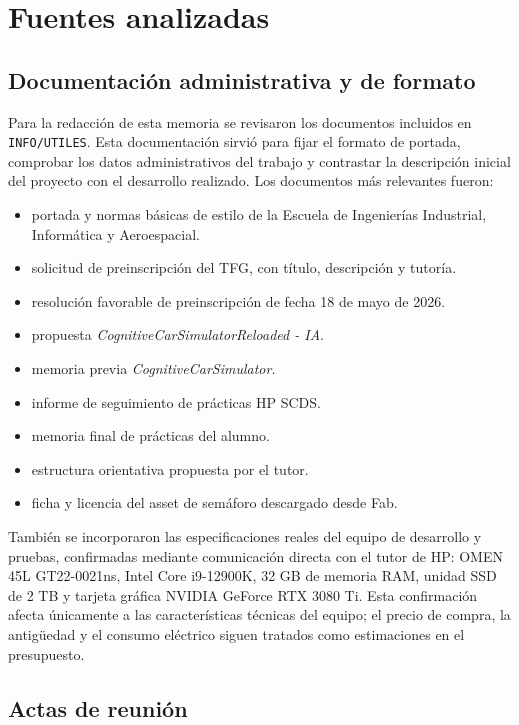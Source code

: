 \chapter{Fuentes analizadas}

\section{Documentación administrativa y de formato}

Para la redacción de esta memoria se revisaron los documentos incluidos en \texttt{INFO/UTILES}. Esta documentación sirvió para fijar el formato de portada, comprobar los datos administrativos del trabajo y contrastar la descripción inicial del proyecto con el desarrollo realizado. Los documentos más relevantes fueron:

\begin{itemize}[leftmargin=*]
  \item portada y normas básicas de estilo de la Escuela de Ingenierías Industrial, Informática y Aeroespacial.
  \item solicitud de preinscripción del TFG, con título, descripción y tutoría.
  \item resolución favorable de preinscripción de fecha 18 de mayo de 2026.
  \item propuesta \textit{CognitiveCarSimulatorReloaded - IA}.
  \item memoria previa \textit{CognitiveCarSimulator}.
  \item informe de seguimiento de prácticas HP SCDS.
  \item memoria final de prácticas del alumno.
  \item estructura orientativa propuesta por el tutor.
  \item ficha y licencia del asset de semáforo descargado desde Fab.
\end{itemize}

También se incorporaron las especificaciones reales del equipo de desarrollo y pruebas, confirmadas mediante comunicación directa con el tutor de HP: OMEN 45L GT22-0021ns, Intel Core i9-12900K, 32 GB de memoria RAM, unidad SSD de 2 TB y tarjeta gráfica NVIDIA GeForce RTX 3080 Ti. Esta confirmación afecta únicamente a las características técnicas del equipo; el precio de compra, la antigüedad y el consumo eléctrico siguen tratados como estimaciones en el presupuesto.

\section{Actas de reunión}

